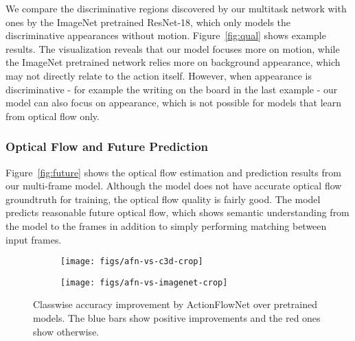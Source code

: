 \documentclass[10pt,twocolumn,letterpaper]{article}
\begin{document}
We compare the discriminative regions discovered by our multitask network with ones by the ImageNet pretrained ResNet-18, which only models the discriminative appearances without motion.
Figure~\ref{fig:qual} shows example results.
The visualization reveals that our model focuses more on motion, while the ImageNet pretrained network relies more on background appearance, which may not directly relate to the action itself.
However, when appearance is discriminative - for example the writing on the board in the last example - our model can also focus on appearance, which is not possible for models that learn from optical flow only.

\vspace{-.5em}
\subsubsection{Optical Flow and Future Prediction}
\vspace{-.5em}
Figure~\ref{fig:future} shows the optical flow estimation and prediction results from our multi-frame model.
Although the model does not have accurate optical flow groundtruth for training, the optical flow quality is fairly good.
The model predicts reasonable future optical flow, which shows semantic understanding from the model to the frames in addition to simply performing matching between input frames.
\begin{figure}[h!]
\centering
  \begin{subfigure}[ht]{\linewidth}
	\texttt{[image: figs/afn-vs-c3d-crop]}
    \vspace{-1.2em}
  \end{subfigure}
  \begin{subfigure}[ht]{\linewidth}
	\texttt{[image: figs/afn-vs-imagenet-crop]}
  \end{subfigure}
  \vspace{-.5em}
    \caption{Classwise accuracy improvement by ActionFlowNet over pretrained models. The blue bars show positive improvements and the red ones show otherwise.}
	\label{fig:class_wise_improvement}
  \vspace{-1.5em}
\end{figure}
\end{document}

